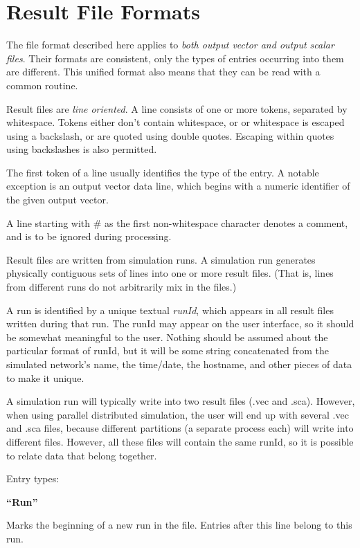 \chapter{Result File Formats}
\label{cha:result-file-formats}

The file format described here applies to \textit{both output vector and
output scalar files}. Their formats are consistent, only the types of
entries occurring into them are different. This unified format also
means that they can be read with a common routine.

Result files are \textit{line oriented}. A line consists of one or more
tokens, separated by whitespace. Tokens either don't
contain whitespace, or or whitespace is escaped using a backslash, or
are quoted using double quotes. Escaping within quotes using
backslashes is also permitted.

The first token of a line usually identifies the type of the entry. A
notable exception is an output vector data line, which begins with a
numeric identifier of the given output vector.

A line starting with \# as the first non{}-whitespace character denotes
a comment, and is to be ignored during processing.

Result files are written from simulation runs. A simulation run
generates physically contiguous sets of lines into one or more result
files. (That is, lines from different runs do not arbitrarily mix in
the files.)


A run is identified by a unique textual\textit{ runId}, which appears in
all result files written during that run. The runId may appear on the
user interface, so it should be somewhat meaningful to the user.
Nothing should be assumed about the particular format of runId, but it
will be some string concatenated from the simulated network's name, the
time/date, the hostname, and other pieces of data to make it unique.


A simulation run will typically write into two result files (.vec and
.sca). However, when using parallel distributed simulation, the user
will end up with several .vec and .sca files, because different
partitions (a separate process each) will write into different files.
However, all these files will contain the same runId, so it is possible
to relate data that belong together.

\bigskip

Entry types:

{\bfseries
``Run''}

Marks the beginning of a new run in the file. Entries after this line
belong to this run.


